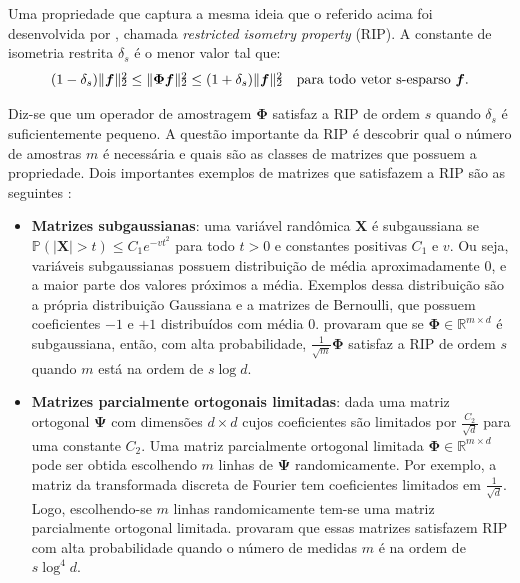 \documentclass[cic,tc]{iiufrgs}
\def\SPSB#1#2{\rlap{\textsuperscript{#1}}\SB{#2}}
\def\SB#1{\textsubscript{#1}}
\renewcommand{\vec}[1]{\bm{#1}}
\newcommand{\mat}[1]{\bm{#1}}
\begin{document}
Uma propriedade que captura a mesma ideia que o referido acima foi desenvolvida por \citet{CandesSignalRecovery}, chamada 
\textit{restricted isometry property} (RIP). A constante de isometria restrita 
$\delta_s$ é o menor valor tal que:
\begin{equation}
    \label{eq:rip}
    (1 - \delta_s)\lVert \vec{f} \rVert\SPSB{2}{2} \le \lVert \mathbf{\Phi} \vec{f} \rVert \SPSB{2}{2} \le 
    (1 + \delta_s)\lVert \vec{f} \rVert\SPSB{2}{2} \hspace{1em} \text{para todo vetor s-esparso } \vec{f}.
\end{equation}

Diz-se que um operador de amostragem $\mathbf{\Phi}$ satisfaz a RIP de ordem $s$ quando $\delta_s$ é suficientemente
pequeno. %
A questão importante da RIP é descobrir qual o número de amostras $m$ é necessária e quais são as 
classes de matrizes que possuem a propriedade. Dois importantes exemplos de matrizes que satisfazem a RIP são
as seguintes \cite{chen2015compressed}: 
\begin{itemize}
    \item \textbf{Matrizes subgaussianas}: uma variável randômica $\mat{X}$ é subgaussiana se 
    $\mathbb{P}(|\mat{X}| > t) \le C_1e^{-vt^2}$ para todo $t>0$ e constantes positivas $C_1$ e $v$. Ou seja,
    variáveis subgaussianas possuem distribuição de média aproximadamente $0$, e a maior parte dos valores
    próximos a média. Exemplos dessa distribuição são a própria distribuição Gaussiana e a matrizes de 
    Bernoulli, que possuem coeficientes $-1$ e $+1$ distribuídos com média $0$. \citet{Mendelson2008} provaram que
    se $\mat{\Phi} \in \mathbb{R}^{m\times d}$ é subgaussiana, então, com alta probabilidade, $\frac{1}{\sqrt{m}}\mat{\Phi}$
    satisfaz a RIP de ordem $s$ quando $m$ está na ordem de $s\log{d}$.
    \item \textbf{Matrizes parcialmente ortogonais limitadas}: dada uma matriz ortogonal $\mat{\Psi}$ com dimensões $d\times d$
    cujos coeficientes são limitados por $\frac{C_2}{\sqrt{d}}$ para uma constante $C_2$. 
    Uma matriz parcialmente ortogonal limitada $\mat{\Phi} \in \mathbb{R}^{m\times d}$ 
    pode ser obtida escolhendo $m$ linhas de $\mat{\Psi}$ randomicamente.
    Por exemplo, a matriz da transformada discreta de Fourier tem coeficientes limitados em $\frac{1}{\sqrt{d}}$.
    Logo, escolhendo-se $m$ linhas randomicamente tem-se uma matriz parcialmente ortogonal limitada.
    \citet{rudelson2008sparse} provaram que essas matrizes satisfazem RIP com alta probabilidade quando
    o número de medidas $m$ é na ordem de $s\log^4{d}$.
\end{itemize}
\end{document}
